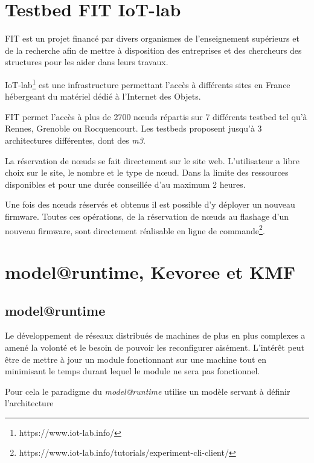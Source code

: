 \section{Testbed FIT IoT-lab}

FIT est un projet financé par divers organismes de l'enseignement supérieurs et de la recherche afin de mettre à disposition des entreprises et des chercheurs des structures pour les aider dans leurs travaux.

IoT-lab\footnote{https://www.iot-lab.info/} est une infrastructure permettant l'accès à différents sites en France hébergeant du matériel dédié à l'Internet des Objets.

FIT permet l'accès à plus de 2700 nœuds répartis sur 7 différents testbed tel qu'à Rennes, Grenoble ou Rocquencourt. Les testbeds proposent jusqu'à 3 architectures différentes, dont des \emph{m3}.


La réservation de nœuds se fait directement sur le site web. L'utilisateur a libre choix sur le site, le nombre et le type de nœud. Dans la limite des ressources disponibles et pour une durée conseillée d'au maximum 2 heures.

Une fois des nœuds réservés et obtenus il est possible d'y déployer un nouveau firmware. Toutes ces opérations, de la réservation de nœuds au flashage d'un nouveau firmware, sont directement réalisable en ligne de commande\footnote{https://www.iot-lab.info/tutorials/experiment-cli-client/}.

\section{model@runtime, Kevoree et KMF}

\subsection{model@runtime}

Le développement de réseaux distribués de machines de plus en plus complexes a amené la volonté et le besoin de pouvoir les reconfigurer aisément. L'intérêt peut être de mettre à jour un module fonctionnant sur une machine tout en minimisant le temps durant lequel le module ne sera pas fonctionnel.

Pour cela le paradigme du \emph{model@runtime} utilise un modèle servant à définir l'architecture
 

